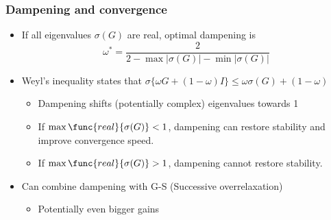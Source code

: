\documentclass[bigger]{beamer}
\begin{document}
\begin{frame}%

\frametitle{Dampening and convergence}

\begin{itemize}
\item If all eigenvalues $\sigma (G)$ are real, optimal dampening is%
\begin{equation*}
\omega ^{\ast }=\frac{2}{2-\max \left\vert \sigma (G)\right\vert -\min
\left\vert \sigma (G)\right\vert }
\end{equation*}

\item Weyl's inequality states that $\sigma \{\omega G+(1-\omega )I\}\leq\omega \sigma
(G)+(1-\omega )$

\begin{itemize}
\item Dampening shifts (potentially complex) eigenvalues towards 1

\item If $\max \func{real}\{\sigma (G)\}<1$, dampening can restore stability 
\newline
and improve convergence speed.

\item If $\max \func{real}\{\sigma (G)\}>1$, dampening cannot restore
stability.
\end{itemize}

\item Can combine dampening with G-S (Successive overrelaxation)

\begin{itemize}
\item Potentially even bigger gains
\end{itemize}
\end{itemize}


\end{frame}%
\end{document}
